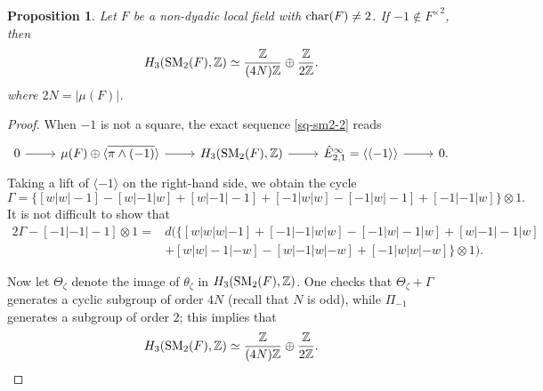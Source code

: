 \documentclass[11pt]{amsart}
\theoremstyle{definition}
\theoremstyle{plain}
\newtheorem{prp}[ntn]{Proposition}
\numberwithin{equation}{section}
\newcommand{\z}{\mathbb{Z}}
\newcommand{\lan}{\langle}
\newcommand{\ran}{\rangle}
\newcommand{\SM}{\mathit{{\rm SM}}}
\renewcommand{\char}{{\rm char}}
\begin{document}
\begin{prp}
    Let $F$ be a non-dyadic local field with $\char(F)\neq 2$. If $-1\notin{F^\times}^2$, then
    \[
        H_3(\SM_2(F),\z)\simeq \frac{\z}{(4N)\z}\oplus\frac{\z}{2\z}. 
    \]
    where $2N=|\mu(F)|$.
\end{prp}
\begin{proof}
    When $-1$ is not a square, the exact sequence \eqref{sq-sm2-2} reads
    \[
        \begin{tikzcd}
            0 \ar[r]& \mu(F)\oplus\lan\overline{\pi\wedge(-1)}\ran\ar[r] & H_3(\SM_2(F),\z)\ar[r] & \hat{E}^{\infty}_{2,1}=\lan\lan -1\ran\ran\ar[r] & 0.
        \end{tikzcd}
    \]
    Taking a lift of $\lan -1\ran$ on the right-hand side, we obtain the cycle
    \[
        \Gamma = \{[w|w|-1]-[w|-1|w]+[w|-1|-1]+[-1|w|w]-[-1|w|-1]+[-1|-1|w]\}\otimes 1.
    \]
    It is not difficult to show that
    \begin{align*}
        2\Gamma-[-1|-1|-1]\otimes 1=&d\big(\{[w|w|w|-1]+[-1|-1|w|w]-[-1|w|-1|w]+[w|-1|-1|w]\\
        &+[w|w|-1|-w]-[w|-1|w|-w]+[-1|w|w|-w]\}\otimes 1\big).
    \end{align*}
    
    Now let $\Theta_\zeta$ denote the image of $\theta_{\zeta}$ in $H_3(\SM_2(F),\z)$. One checks that $\Theta_{\zeta}+\Gamma$ generates a cyclic subgroup of order $4N$ (recall that $N$ is odd), while $\Pi_{-1}$ generates a subgroup of order $2$; this implies that
    \[
        H_3(\SM_2(F),\z)\simeq\frac{\z}{(4N)\z}\oplus\frac{\z}{2\z}.
    \]
\end{proof}
\end{document}
